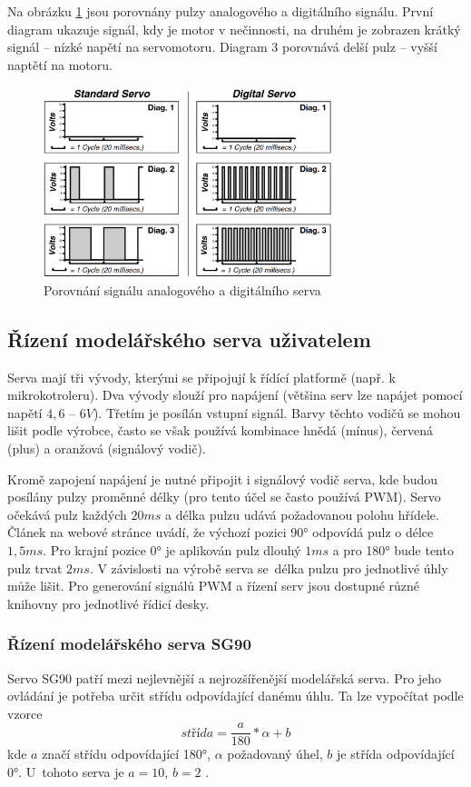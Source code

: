 Na obrázku \ref{analogdigital} jsou porovnány pulzy analogového a digitálního signálu. První diagram ukazuje signál, kdy je motor v nečinnosti, na druhém je zobrazen krátký signál -- nízké napětí na servomotoru. Diagram 3 porovnává delší pulz -- vyšší naptětí na motoru.


\begin{figure}[hbt]
	\centering
	\includegraphics[width=0.75\textwidth]{obrazky-figures/analogVdigital.png}
	\caption{Porovnání signálu analogového a digitálního serva \cite{DigitalServo}}
	\label{analogdigital}
\end{figure}

\subsection*{Řízení modelářského serva uživatelem}
Serva mají tři vývody, kterými se připojují k řídící platformě (např. k mikrokotroleru). Dva vývody slouží pro napájení (většina serv lze napájet pomocí napětí $4,6$ -- $6V$). Třetím je posílán vstupní signál. Barvy těchto vodičů se mohou lišit podle výrobce, často se však používá kombinace hnědá (mínus), červená (plus) a oranžová (signálový vodič).

Kromě zapojení napájení je nutné připojit i signálový vodič serva, kde budou posílány pulzy proměnné délky (pro tento účel se často používá PWM). Servo očekává pulz každých $20ms$ a délka pulzu udává požadovanou polohu hřídele. Článek na webové stránce \cite{servoCircuitDigest} uvádí, že výchozí pozici 90° odpovídá pulz o délce $1,5ms$. Pro krajní pozice 0° je aplikován pulz dlouhý $1ms$ a pro 180° bude tento pulz trvat $2ms$. V závislosti na výrobě serva se~délka pulzu pro jednotlivé úhly může lišit. Pro generování signálů PWM a řízení serv jsou dostupné různé knihovny pro jednotlivé řídicí desky.


\subsubsection{Řízení modelářského serva SG90}
Servo SG90 patří mezi nejlevnější a nejrozšířenější modelářská serva. Pro jeho ovládání je potřeba určit střídu odpovídající danému úhlu. Ta lze vypočítat podle vzorce
$$\textit{střída} = \frac{a}{180} * \alpha + b$$
kde $a$ značí střídu odpovídající 180°, $\alpha$ požadovaný úhel, $b$ je střída odpovídající 0°. U~tohoto serva je $a = 10$, $b = 2$ \cite{servoPythonExemplary}.

